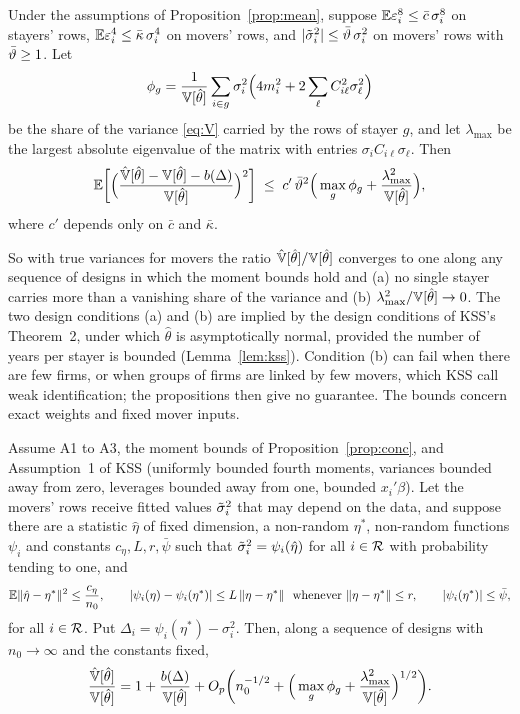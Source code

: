 \begin{proposition}[Convergence]\label{prop:conc}
Under the assumptions of Proposition~\ref{prop:mean}, suppose $\mathbb{E}\varepsilon_i^8\le\bar c\,\sigma_i^8$ on
stayers' rows, $\mathbb{E}\varepsilon_i^4\le\bar\kappa\,\sigma_i^4$ on movers' rows, and
$|\tilde\sigma_i^2|\le\bar\vartheta\,\sigma_i^2$ on movers' rows with $\bar\vartheta\ge1$. Let
\[
\phi_g=\frac{1}{\mathbb{V}[\hat\theta]}\sum_{i\in g}\sigma_i^2\Big(4m_i^2+2\sum_\ell C_{i\ell}^2\sigma_\ell^2\Big)
\]
be the share of the variance \eqref{eq:V} carried by the rows of stayer $g$, and let $\lambda_{\max}$ be the
largest absolute eigenvalue of the matrix with entries $\sigma_iC_{i\ell}\sigma_\ell$. Then
\[
\mathbb{E}\bigg[\Big(\frac{\hat{\mathbb{V}}[\hat\theta]-\mathbb{V}[\hat\theta]-b(\Delta)}{\mathbb{V}[\hat\theta]}\Big)^{2}\bigg]\;\le\;
c'\,\bar\vartheta^2\Big(\max_g\phi_g+\frac{\lambda_{\max}^2}{\mathbb{V}[\hat\theta]}\Big),
\]
where $c'$ depends only on $\bar c$ and $\bar\kappa$.
\end{proposition}

So with true variances for movers the ratio $\hat{\mathbb{V}}[\hat\theta]/\mathbb{V}[\hat\theta]$ converges to one along any
sequence of designs in which the moment bounds hold and (a) no single stayer carries more than a vanishing
share of the variance and (b) $\lambda_{\max}^2/\mathbb{V}[\hat\theta]\to0$. The two design conditions (a) and (b) are
implied by the design conditions of KSS's Theorem~2, under which $\hat\theta$ is asymptotically normal, provided
the number of years per stayer is bounded (Lemma~\ref{lem:kss}). Condition (b) can fail when there are few
firms, or when groups of firms are linked by few movers, which KSS call weak identification; the propositions
then give no guarantee. The bounds concern exact weights and fixed mover inputs.

\begin{proposition}\label{prop:fitted}
Assume A1 to A3, the moment bounds of Proposition~\ref{prop:conc}, and Assumption~1 of KSS (uniformly bounded
fourth moments, variances bounded away from zero, leverages bounded away from one, bounded $x_i'\beta$). Let
the movers' rows receive fitted values $\tilde\sigma_i^2$ that may depend on the data, and suppose there are a statistic
$\hat\eta$ of fixed dimension, a non-random $\eta^*$, non-random functions $\psi_i$ and constants
$c_\eta,L,r,\bar\psi$ such that $\tilde\sigma_i^2=\psi_i(\hat\eta)$ for all $i\in\mathcal{R}$ with probability tending to one,
and
\[
\mathbb{E}\|\hat\eta-\eta^*\|^2\le\frac{c_\eta}{n_0},\qquad
|\psi_i(\eta)-\psi_i(\eta^*)|\le L\,\|\eta-\eta^*\|\ \text{ whenever }\|\eta-\eta^*\|\le r,\qquad
|\psi_i(\eta^*)|\le\bar\psi ,
\]
for all $i\in\mathcal{R}$. Put $\Delta_i=\psi_i(\eta^*)-\sigma_i^2$. Then, along a sequence of designs with
$n_0\to\infty$ and the constants fixed,
\[
\frac{\hat{\mathbb{V}}[\hat\theta]}{\mathbb{V}[\hat\theta]}=1+\frac{b(\Delta)}{\mathbb{V}[\hat\theta]}+O_p\bigg(n_0^{-1/2}+
\Big(\max_g\phi_g+\frac{\lambda_{\max}^2}{\mathbb{V}[\hat\theta]}\Big)^{1/2}\bigg).
\]
\end{proposition}

